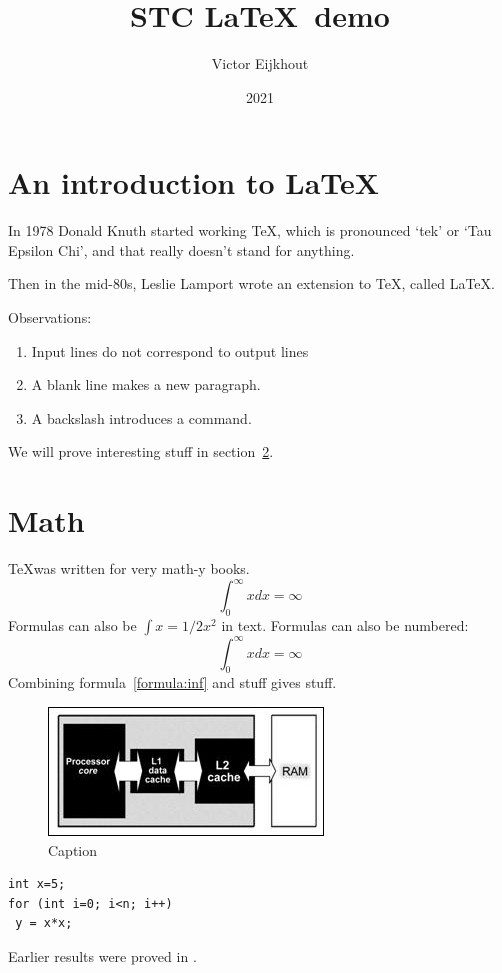 \documentclass{article}
\begin{document}
\title{STC \LaTeX\ demo}
\author{Victor Eijkhout}
\date{2021}
\maketitle

\section{An introduction to \LaTeX}

In 1978 Donald Knuth started working \TeX, 
which is pronounced `tek' or `Tau Epsilon Chi',
and that really doesn't stand for anything.

Then in the mid-80s, Leslie Lamport
wrote an extension to \TeX, called \LaTeX.

Observations:
\begin{enumerate}
    \item Input lines do not correspond to output lines
    \item A blank line makes a new paragraph.
    \item A backslash introduces a command.
\end{enumerate}
We will prove interesting stuff in
section~\ref{sec:math}.

\section{Math}
\label{sec:math}

\TeX was written for very math-y books.
\[ \int_0^\infty xdx=\infty \]
Formulas can also be $\int x=1/2x^2$ in text.
Formulas can also be numbered:
\begin{equation}
\int_0^\infty xdx=\infty
\label{formula:inf}
\end{equation}
Combining formula~\ref{formula:inf} and stuff
gives stuff.

\begin{figure}[ht]
    \centering
\includegraphics[scale=1.1]{graphics/caches}
    \caption{Caption}
    \label{fig:my_label}
\end{figure}

\begin{lstlisting}
int x=5;
for (int i=0; i<n; i++)
 y = x*x;
\end{lstlisting}
Earlier results were proved in \cite{AdJo:colorblind}.



\end{document}
